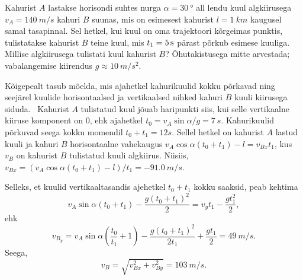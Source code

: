
Kahurist $A$ lastakse horisondi suhtes nurga $\alpha=\SI{30}{\degree}$ all lendu kuul algkiirusega $v_A=\SI{140}{m/s}$ kahuri $B$ suunas, mis on esimesest kahurist $l=\SI{1}{km}$ kaugusel samal tasapinnal. Sel hetkel, kui kuul on oma trajektoori kõrgeimas punktis, tulistatakse kahurist $B$ teine kuul, mis $t_1=\SI 5s$ pärast põrkub  esimese kuuliga. Millise algkiirusega tulistati kuul kahurist $B$? Õhutakistusega mitte arvestada; vabalangemise kiirendus $g\approx\SI{10}{m/s^2}$.




\hint
Kõigepealt tasub mõelda, mis ajahetkel kahurikuulid kokku põrkavad ning seejärel kuulide horisontaalsed ja vertikaalsed nihked kahuri $B$ kuuli kiirusega siduda.\solu
\
Kahurist $A$ tulistatud kuul jõuab haripunkti siis, kui selle vertikaalne kiiruse komponent on $0$, ehk ajahetkel $t_0 = v_A\sin\alpha/g = \SI{7}{s}$. Kahurikuulid põrkuvad seega kokku momendil $t_0 + t_1 = \SI{12}s$. Sellel hetkel on kahurist $A$ lastud kuuli ja kahuri $B$ horisontaalne vahekaugus $v_A\cos\alpha(t_0 + t_1) - l = v_{Bx}t_1$, kus $v_B$ on kahurist $B$ tulistatud kuuli algkiirus. Niisiis, $v_{Bx} = (v_A\cos\alpha(t_0 + t_1) - l)/t_1 = \SI{-91.0}{m/s}$.

Selleks, et kuulid vertikaaltasandis ajehetkel $t_0 + t_1$ kokku saaksid, peab kehtima
\[
v_A\sin\alpha (t_0 + t_1) - \frac{g(t_0 + t_1)^2}{2} = v_yt_1 - \frac{gt_1^2}{2},
\]
ehk
\[
v_{B_y} = v_A\sin\alpha \left(\frac{t_0}{t_1} + 1\right) - \frac{g(t_0 + t_1)^2}{2t_1} + \frac{gt_1}{2} = \SI{49}{m/s}.
\]
Seega,
\[
v_B = \sqrt{v_{Bx}^2 + v_{By}^2} = \SI{103}{m/s}.
\]\probend